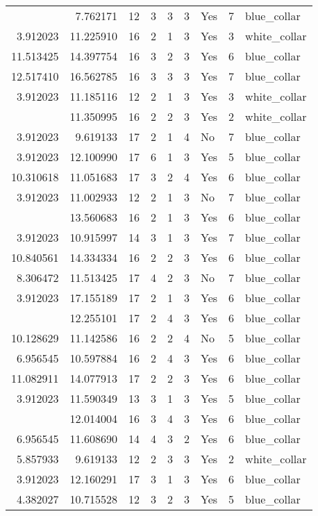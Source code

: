 \documentclass[
]{article}
\begin{document}
\begin{longtable}[t]{rrrrrllrl}
\addlinespace
4.605170 & 7.762171 & 12 & 3 & 3 & 3 & Yes & 7 & blue\_collar\\
3.912023 & 11.225910 & 16 & 2 & 1 & 3 & Yes & 3 & white\_collar\\
11.513425 & 14.397754 & 16 & 3 & 2 & 3 & Yes & 6 & blue\_collar\\
12.517410 & 16.562785 & 16 & 3 & 3 & 3 & Yes & 7 & blue\_collar\\
3.912023 & 11.185116 & 12 & 2 & 1 & 3 & Yes & 3 & white\_collar\\
\addlinespace
6.956545 & 11.350995 & 16 & 2 & 2 & 3 & Yes & 2 & white\_collar\\
3.912023 & 9.619133 & 17 & 2 & 1 & 4 & No & 7 & blue\_collar\\
3.912023 & 12.100990 & 17 & 6 & 1 & 3 & Yes & 5 & blue\_collar\\
10.310618 & 11.051683 & 17 & 3 & 2 & 4 & Yes & 6 & blue\_collar\\
3.912023 & 11.002933 & 12 & 2 & 1 & 3 & No & 7 & blue\_collar\\
\addlinespace
3.912023 & 13.560683 & 16 & 2 & 1 & 3 & Yes & 6 & blue\_collar\\
3.912023 & 10.915997 & 14 & 3 & 1 & 3 & Yes & 7 & blue\_collar\\
10.840561 & 14.334334 & 16 & 2 & 2 & 3 & Yes & 6 & blue\_collar\\
8.306472 & 11.513425 & 17 & 4 & 2 & 3 & No & 7 & blue\_collar\\
3.912023 & 17.155189 & 17 & 2 & 1 & 3 & Yes & 6 & blue\_collar\\
\addlinespace
11.277836 & 12.255101 & 17 & 2 & 4 & 3 & Yes & 6 & blue\_collar\\
10.128629 & 11.142586 & 16 & 2 & 2 & 4 & No & 5 & blue\_collar\\
6.956545 & 10.597884 & 16 & 2 & 4 & 3 & Yes & 6 & blue\_collar\\
11.082911 & 14.077913 & 17 & 2 & 2 & 3 & Yes & 6 & blue\_collar\\
3.912023 & 11.590349 & 13 & 3 & 1 & 3 & Yes & 5 & blue\_collar\\
\addlinespace
11.408120 & 12.014004 & 16 & 3 & 4 & 3 & Yes & 6 & blue\_collar\\
6.956545 & 11.608690 & 14 & 4 & 3 & 2 & Yes & 6 & blue\_collar\\
5.857933 & 9.619133 & 12 & 2 & 3 & 3 & Yes & 2 & white\_collar\\
3.912023 & 12.160291 & 17 & 3 & 1 & 3 & Yes & 6 & blue\_collar\\
4.382027 & 10.715528 & 12 & 3 & 2 & 3 & Yes & 5 & blue\_collar\\

\end{longtable}
\end{document}
